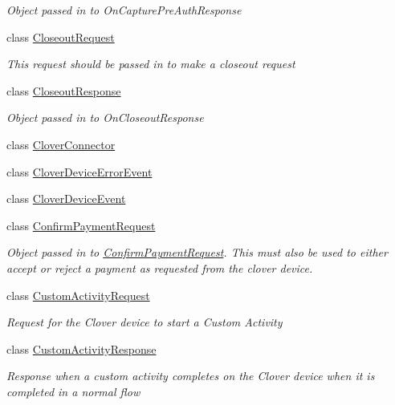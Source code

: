 \begin{DoxyCompactItemize}
\begin{DoxyCompactList}\small\item\em Object passed in to On\+Capture\+Pre\+Auth\+Response \end{DoxyCompactList}\item 
class \hyperlink{classcom_1_1clover_1_1remotepay_1_1sdk_1_1_closeout_request}{Closeout\+Request}
\begin{DoxyCompactList}\small\item\em This request should be passed in to make a closeout request \end{DoxyCompactList}\item 
class \hyperlink{classcom_1_1clover_1_1remotepay_1_1sdk_1_1_closeout_response}{Closeout\+Response}
\begin{DoxyCompactList}\small\item\em Object passed in to On\+Closeout\+Response \end{DoxyCompactList}\item 
class \hyperlink{classcom_1_1clover_1_1remotepay_1_1sdk_1_1_clover_connector}{Clover\+Connector}
\item 
class \hyperlink{classcom_1_1clover_1_1remotepay_1_1sdk_1_1_clover_device_error_event}{Clover\+Device\+Error\+Event}
\item 
class \hyperlink{classcom_1_1clover_1_1remotepay_1_1sdk_1_1_clover_device_event}{Clover\+Device\+Event}
\item 
class \hyperlink{classcom_1_1clover_1_1remotepay_1_1sdk_1_1_confirm_payment_request}{Confirm\+Payment\+Request}
\begin{DoxyCompactList}\small\item\em Object passed in to \hyperlink{classcom_1_1clover_1_1remotepay_1_1sdk_1_1_confirm_payment_request}{Confirm\+Payment\+Request}. This must also be used to either accept or reject a payment as requested from the clover device. \end{DoxyCompactList}\item 
class \hyperlink{classcom_1_1clover_1_1remotepay_1_1sdk_1_1_custom_activity_request}{Custom\+Activity\+Request}
\begin{DoxyCompactList}\small\item\em Request for the Clover device to start a Custom Activity \end{DoxyCompactList}\item 
class \hyperlink{classcom_1_1clover_1_1remotepay_1_1sdk_1_1_custom_activity_response}{Custom\+Activity\+Response}
\begin{DoxyCompactList}\small\item\em Response when a custom activity completes on the Clover device when it is completed in a normal flow \end{DoxyCompactList}\item 

\end{DoxyCompactItemize}
